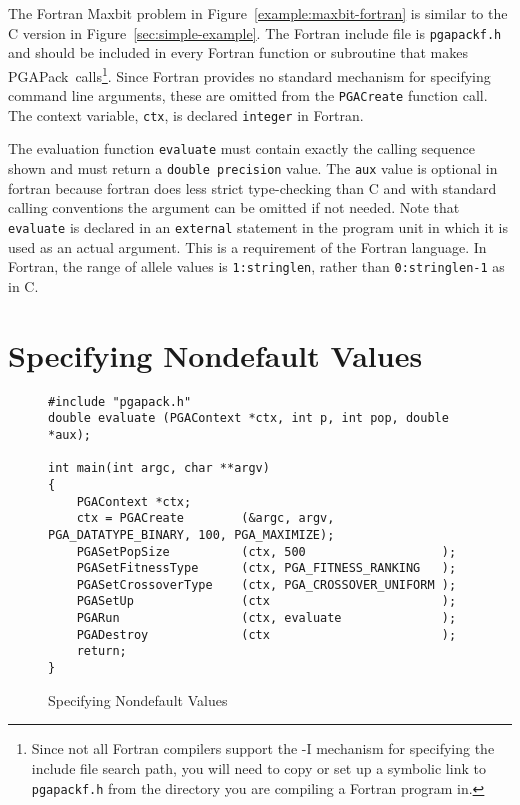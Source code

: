 \documentclass{report}
\newcommand{\pga}{PGAPack}
\begin{document}
The Fortran Maxbit problem in Figure~\ref{example:maxbit-fortran} is similar
to the C version in Figure~\ref{sec:simple-example}.  The Fortran include file
is {\tt pgapackf.h} and should be included in every Fortran function or
subroutine that makes \pga\ calls\footnote{Since not all Fortran compilers
support the -I mechanism for specifying the include file search path,
you will need to copy or set up a symbolic link to {\tt pgapackf.h} from
the directory you are compiling a Fortran program in.}.  Since Fortran
provides no standard mechanism for specifying command line arguments, these
are omitted from the {\tt PGACreate} function call.  The context variable,
{\tt ctx}, is declared {\tt integer} in Fortran.

The evaluation function {\tt evaluate} must contain exactly the calling
sequence shown and must return a {\tt double precision} value. The
\verb+aux+ value is optional in fortran because fortran does less strict
type-checking than C and with standard calling conventions the argument
can be omitted if not needed.  Note that {\tt
evaluate} is declared in an {\tt external} statement in the program unit in
which it is used as an actual argument.  This is a requirement of the Fortran
language.  In Fortran, the range of allele values is {\tt 1:stringlen}, rather
than {\tt 0:stringlen-1} as in C.

\section{Specifying Nondefault Values}\label{sec:default-values}

\begin{figure}
\begin{verbatim}
#include "pgapack.h"
double evaluate (PGAContext *ctx, int p, int pop, double *aux);

int main(int argc, char **argv)
{
    PGAContext *ctx; 
    ctx = PGACreate        (&argc, argv, PGA_DATATYPE_BINARY, 100, PGA_MAXIMIZE);
    PGASetPopSize          (ctx, 500                   );
    PGASetFitnessType      (ctx, PGA_FITNESS_RANKING   );
    PGASetCrossoverType    (ctx, PGA_CROSSOVER_UNIFORM );
    PGASetUp               (ctx                        );
    PGARun                 (ctx, evaluate              );
    PGADestroy             (ctx                        );
    return;
}
\end{verbatim}
\caption{Specifying Nondefault Values}
\label{example:soph-main}
\end{figure}
\end{document}
